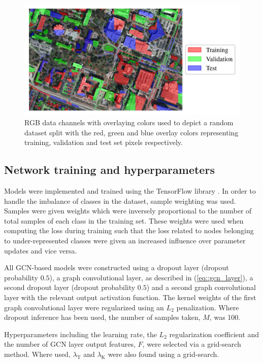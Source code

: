 \documentclass[
twocolumn,
]{ceurart}
\begin{document}
\begin{figure}[!t]
\centering
\includegraphics[width=\columnwidth]{figures/dataset_split.jpg}
\caption{RGB data channels with overlaying colors used to depict a random dataset split with the red, green and blue overlay colors representing training, validation and test set pixels respectively.}
\label{fig::dataset_split}
\end{figure}

\subsection{Network training and hyperparameters}
Models were implemented and trained using the TensorFlow library \cite{Abadi2015}.
In order to handle the imbalance of classes in the dataset, sample weighting was used.
Samples were given weights which were inversely proportional to the number of total samples of each class in the training set.
These weights were used when computing the loss during training such that the loss related to nodes belonging to under-represented classes were given an increased influence over parameter updates and vice versa.

All GCN-based models were constructed using a dropout layer (dropout probability $0.5$), a graph convolutional layer, as described in (\ref{eq::gcn_layer}), a second dropout layer (dropout probability $0.5$) and a second graph convolutional layer with the relevant output activation function.
The kernel weights of the first graph convolutional layer were regularized using an $L_2$ penalization.
Where dropout inference has been used, the number of samples taken, $M$, was 100.

Hyperparameters including the learning rate, the $L_2$ regularization coefficient and the number of GCN layer output features, $F$, were selected via a grid-search method.
Where used, $\lambda_{\text{T}}$ and $\lambda_{\text{K}}$ were also found using a grid-search.
\end{document}
